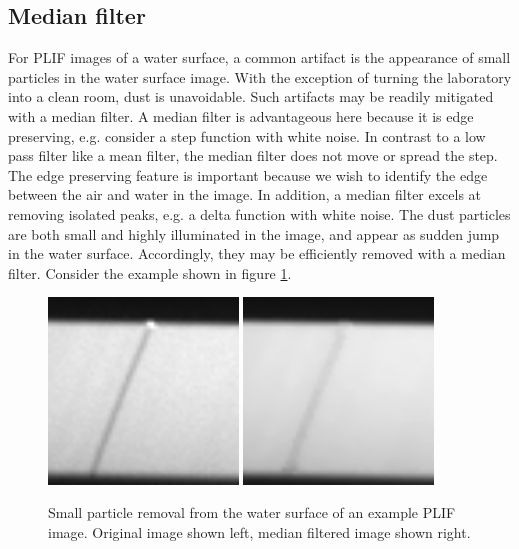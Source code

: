 \subsection{Median filter} \label{sec:medianfilt}
\par
For PLIF images of a water surface, a common artifact is the appearance of small particles in the water surface image.
With the exception of turning the laboratory into a clean room, dust is unavoidable.
Such artifacts may be readily mitigated with a median filter.
A median filter is advantageous here because it is edge preserving, e.g. consider a step function with white noise.
In contrast to a low pass filter like a mean filter, the median filter does not move or spread the step.
The edge preserving feature is important because we wish to identify the edge between the air and water in the image.
In addition, a median filter excels at removing isolated peaks, e.g. a delta function with white noise.
The dust particles are both small and highly illuminated in the image, and appear as sudden jump in the water surface.
Accordingly, they may be efficiently removed with a median filter.
Consider the example shown in figure \ref{fig:medianfilt}.
%
\begin{figure}[H]
	\centering
	\includegraphics[width=0.45\textwidth]{../images/particle-example-1-original-cropped.png}
	\includegraphics[width=0.45\textwidth]{../images/particle-example-1-median-cropped.png}
	\caption{Small particle removal from the water surface of an example PLIF image.
	Original image shown left, median filtered image shown right.}
	\label{fig:medianfilt}
\end{figure}
%
